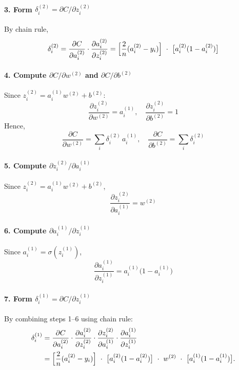 \documentclass{article}
\begin{document}
\paragraph{3. Form \(\delta_i^{(2)} = \partial C/\partial z_i^{(2)}\)\\}
By chain rule,
\[
    \delta_i^{(2)} = \frac{\partial C}{\partial a_i^{(2)}} \cdot \frac{\partial a_i^{(2)}}{\partial z_i^{(2)}}
    = \Bigl[\frac{2}{n}(a_i^{(2)} - y_i)\Bigr]\ \cdot\ \bigl[a_i^{(2)}(1 - a_i^{(2)})\bigr]
\]

\paragraph{4. Compute \(\partial C/\partial w^{(2)}\) and \(\partial C/\partial b^{(2)}\)\\}
Since \(z_i^{(2)} = a_i^{(1)}w^{(2)} + b^{(2)}\):
\[
    \frac{\partial z_i^{(2)}}{\partial w^{(2)}} = a_i^{(1)},
    \quad
    \frac{\partial z_i^{(2)}}{\partial b^{(2)}} = 1
\]
Hence,
\[
    \frac{\partial C}{\partial w^{(2)}} = \sum_i \delta_i^{(2)}\,a_i^{(1)},
    \quad
    \frac{\partial C}{\partial b^{(2)}} = \sum_i \delta_i^{(2)}
\]

\paragraph{5. Compute \(\partial z_i^{(2)}/\partial a_i^{(1)}\)\\}
Since \(z_i^{(2)} = a_i^{(1)} w^{(2)} + b^{(2)}\),
\[
    \frac{\partial z_i^{(2)}}{\partial a_i^{(1)}} = w^{(2)}
\]

\paragraph{6. Compute \(\partial a_i^{(1)}/\partial z_i^{(1)}\)\\}
Since \(a_i^{(1)} = \sigma(z_i^{(1)})\),
\[
    \frac{\partial a_i^{(1)}}{\partial z_i^{(1)}} = a_i^{(1)}\bigl(1 - a_i^{(1)}\bigr)
\]

\paragraph{7. Form \(\delta_i^{(1)} = \partial C/\partial z_i^{(1)}\)\\}
By combining steps 1--6 using chain rule:
\begin{align*}
    \delta_i^{(1)}
    &= \frac{\partial C}{\partial a_i^{(2)}} \cdot \frac{\partial a_i^{(2)}}{\partial z_i^{(2)}} \cdot \frac{\partial z_i^{(2)}}{\partial a_i^{(1)}} \cdot \frac{\partial a_i^{(1)}}{\partial z_i^{(1)}} \\
    &= \Bigl[\frac{2}{n}(a_i^{(2)} - y_i)\Bigr]\ \cdot\ \bigl[a_i^{(2)}(1 - a_i^{(2)})\bigr]\ \cdot\ w^{(2)} \ \cdot\ \bigl[a_i^{(1)}(1 - a_i^{(1)})\bigr].
\end{align*}
\end{document}
